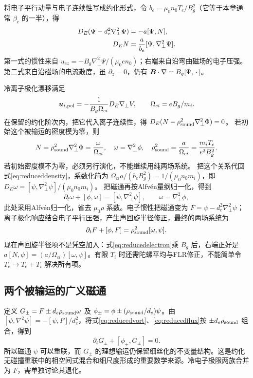 将电子平行动量与电子连续性写成约化形式，令 $b_e=\mu_0n_0T_e/B_g^2$（它等于本章通常 $\beta_e$ 的一半），得
\begin{align}
D_E(\Psi-d_e^2\nabla_\perp^2\Psi)&=-a[\Psi,N],\label{eq:reducedelectron}\\
D_EN&={a\over b_e}[\Psi,\nabla_\perp^2\Psi].\label{eq:reduceddensity}
\end{align}
第一式的惯性来自 $u_{ez}=-B_g\nabla_\perp^2\Psi/(\mu_0en_0)$；右端来自沿弯曲磁场的电子压强。第二式来自沿磁场的电流散度，虽 $\partial_z=0$，仍有 $\bm{B}\cdot\nabla=B_g[\Psi,\,\cdot\,]$。

冷离子极化漂移满足
\begin{equation}
\bm{u}_{i,\rm pol}=-{1\over B_g\Omega_{ci}}D_E\nabla_\perp V,
\qquad\Omega_{ci}=eB_g/m_i.
\end{equation}
在保留的约化阶次内，把它代入离子连续性，得
$D_E(N-\rho_{\rm sound}^2\nabla_\perp^2\Phi)=0$。
若初始这个被输运的密度模为零，则
\begin{equation}
N=\rho_{\rm sound}^2\nabla_\perp^2\Phi={\omega\over\Omega_{ci}},
\quad\omega=\nabla_\perp^2\phi,\quad
\rho_{\rm sound}^2={a\over\Omega_{ci}}={m_iT_e\over e^2B_g^2}.
\end{equation}
若初始密度模不为零，必须另行演化，不能继续用纯两场系统。
把这个关系代回式\eqref{eq:reduceddensity}，系数化简为
$\Omega_{ci}a/(b_eB_g^2)=1/(\mu_0n_0m_i)$，即
$D_E\omega=[\psi,\nabla_\perp^2\psi]/(\mu_0n_0m_i)$。
把磁通再按Alfvén量纲归一化，得到
\begin{equation}\partial_t\omega+[\phi,\omega]=[\psi,\nabla_\perp^2\psi],\qquad\omega=\nabla_\perp^2\phi,\label{eq:reducedvort}\end{equation}
此处采用Alfvén归一化，省去 $\mu_0\rho$ 系数。电子惯性把磁通变为 $F=\psi-d_e^2\nabla_\perp^2\psi$；离子极化响应结合电子平行压强，产生声回旋半径修正，最终的两场系统为
\begin{equation}\partial_tF+[\phi,F]=\rho_{\rm sound}^2[\omega,\psi].\label{eq:reducedflux}\end{equation}
现在声回旋半径项不是凭空加入：式\eqref{eq:reducedelectron}乘 $B_g$ 后，右端正好是 $a[N,\psi]=(a/\Omega_{ci})[\omega,\psi]$。有限 $T_i$ 时还需陀螺平均与FLR修正，不能简单令 $T_e\to T_e+T_i$ 解决所有项。

\subsection{两个被输运的广义磁通}
定义 $G_\pm=F\pm d_e\rho_{\rm sound}\omega$ 及
$\phi_\pm=\phi\pm(\rho_{\rm sound}/d_e)\psi$。由
$[\psi,\nabla^2\psi]=-[\psi,F]/d_e^2$，将式\eqref{eq:reducedvort}、\eqref{eq:reducedflux}按 $\pm d_e\rho_{\rm sound}$ 组合，得到
\begin{equation}\partial_tG_\pm+[\phi_\pm,G_\pm]=0.
\end{equation}
所以磁通 $\psi$ 可以重联，而 $G_\pm$ 的理想输运仍保留细丝化的不变量结构。这是约化无碰撞重联中的相空间式混合和细尺度形成的重要数学来源。冷电子极限两族合并为 $F$，需单独讨论其退化。\citep{Ottaviani1993,Schep1994,L049}

